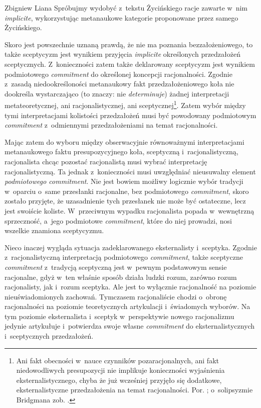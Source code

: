 \begin{artplenv}{Zbigniew Liana}
Spróbujmy wydobyć z~tekstu Życińskiego racje zawarte w~nim \textit{implicite}, wykorzystując metanaukowe kategorie proponowane przez samego Życińskiego.

Skoro jest powszechnie uznaną prawdą, że nie ma poznania bezzałożeniowego, to także sceptycyzm jest wynikiem przyjęcia \textit{implicite} określonych przedzałożeń sceptycznych. Z~konieczności zatem także deklarowany sceptycyzm jest wynikiem podmiotowego \textit{commitment} do określonej koncepcji racjonalności. Zgodnie z~zasadą niedookreśloności metanaukowy fakt przedzałożeniowego koła nie dookreśla wystarczająco (to znaczy: nie \textit{determinuje}) żadnej interpretacji metateoretycznej, ani racjonalistycznej, ani sceptycznej\footnote{Ani fakt obecności w~nauce czynników pozaracjonalnych, ani fakt niedowodliwych presupozycji nie implikuje konieczności wyjaśnienia eksternalistycznego, chyba że już wcześniej przyjęło się dodatkowe, eksternalistyczne przedzałożenia na temat racjonalności. Por.
\parencites[][s.~184]{zycinski_elementy_1996}[][s.~250]{zycinski_elementy_2015}; %
 o~solipsyzmie Bridgmana zob. 
\parencites[][s.~186–188]{zycinski_elementy_1996}[][s.~253–255]{zycinski_elementy_2015}.%
}. Zatem wybór między tymi interpretacjami kolistości przedzałożeń musi być powodowany podmiotowym \textit{commitment} z~odmiennymi przedzałożeniami na temat racjonalności.

Mając zatem do wyboru między obserwacyjnie równoważnymi interpretacjami metanaukowego faktu presupozycyjnego koła, sceptyczną i~racjonalistyczną, racjonalista chcąc pozostać racjonalistą musi wybrać interpretację racjonalistyczną. Ta jednak z~konieczności musi uwzględniać nieusuwalny element \textit{podmiotowego commitment}. Nie jest bowiem możliwy logicznie wybór tradycji w~oparciu o~same przesłanki racjonalne, bez podmiotowego \textit{commitment}, skoro zostało przyjęte, że uzasadnienie tych przesłanek nie może być ostateczne, lecz jest swoiście koliste. W~przeciwnym wypadku racjonalista popada w~wewnętrzną sprzeczność, a~jego podmiotowe \textit{commitment}, które do niej prowadzi, nosi wszelkie znamiona sceptycyzmu.

Nieco inaczej wygląda sytuacja zadeklarowanego eksternalisty i~sceptyka. Zgodnie z~racjonalistyczną interpretacją podmiotowego \textit{commitment}, także sceptyczne \textit{commitment} z~tradycją sceptyczną jest w~pewnym podstawowym sensie racjonalne, gdyż w~ten właśnie sposób działa ludzki rozum, zarówno rozum racjonalisty, jak i~rozum sceptyka. Ale jest to wyłącznie racjonalność na poziomie nieuświadomionych zachowań. Tymczasem racjonaliście chodzi o~obronę racjonalności na poziomie teoretycznych artykulacji i~świadomych wyborów. Na tym poziomie eksternalista i~sceptyk w~perspektywie nowego racjonalizmu jedynie artykułuje i~potwierdza swoje własne \textit{commitment} do eksternalistycznych i~sceptycznych przedzałożeń.


\end{artplenv}

